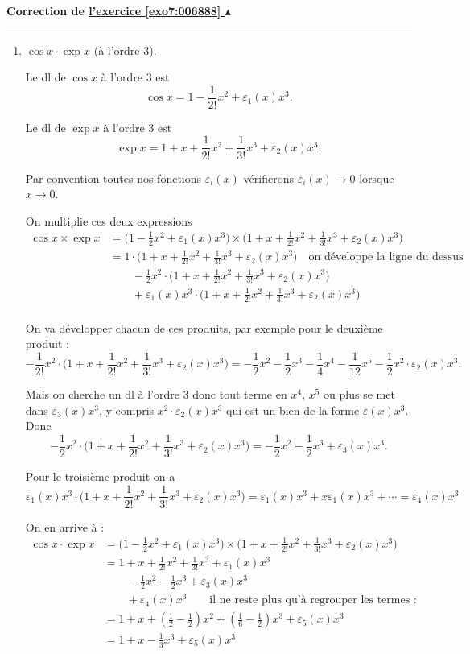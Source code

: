\documentclass[11pt,a4paper]{article}
\renewcommand{\epsilon}{\varepsilon}
\newcounter{exo}
\newcommand{\correction}[1]{\hypertarget{cor7:#1}{}\label{cor7:#1}{\bf Correction de \hyperlink{exo7:#1}{l'exercice \ref{exo7:#1} $\blacktriangle$}}\vspace{1mm}\hrule\vspace{1mm}}
\begin{document}
\correction{006888}
\begin{enumerate}
  \item $\cos x \cdot \exp x$ (à l'ordre $3$).
  
Le dl de $\cos x$ à l'ordre $3$ est
$$\cos x = 1 - \frac{1}{2!} x^2 + \epsilon_1(x)x^3.$$

Le dl de $\exp x$ à l'ordre $3$ est
$$\exp x =1+x+\frac1{2!}x^2+\frac1{3!}x^3 + \epsilon_2(x)x^3.$$

Par convention toutes nos fonctions $\epsilon_i(x)$ vérifierons $\epsilon_i(x)\to 0$ lorsque $x\to0$.

\bigskip

On multiplie ces deux expressions  
\begin{align*}
\cos x \times \exp x 
  & =  \Big(1 - \frac{1}{2} x^2   + \epsilon_1(x)x^3\Big) \times \Big( 1+x+\frac1{2!}x^2+\frac1{3!}x^3 + \epsilon_2(x)x^3\Big) \\
  & =  1 \cdot \Big(1+x+\frac1{2!}x^2+\frac1{3!}x^3 + \epsilon_2(x)x^3 \Big)  \quad \text{on développe la ligne du dessus}\\  
  & \qquad  - \frac{1}{2} x^2 \cdot \Big( 1+x+\frac1{2!}x^2+\frac1{3!}x^3 + \epsilon_2(x)x^3 \Big) \\
  & \qquad  + \epsilon_1(x)x^3 \cdot \Big(1+x+\frac1{2!}x^2+\frac1{3!}x^3 + \epsilon_2(x)x^3 \Big) \\
\end{align*}

On va développer chacun de ces produits, par exemple pour le deuxième produit :
$$- \frac{1}{2!} x^2 \cdot \Big(  1+x+\frac1{2!}x^2+\frac1{3!}x^3 +  \epsilon_2(x)x^3\Big)
= - \frac{1}{2} x^2 - \frac{1}{2} x^3 - \frac14x^4  -\frac1{12}x^5 -\frac12x^2\cdot \epsilon_2(x)x^3.$$

Mais on cherche un dl à l'ordre $3$ donc tout terme en $x^4$, $x^5$ ou plus se met dans $\epsilon_3(x)x^3$,
y compris $x^2 \cdot \epsilon_2(x)x^3$ qui est un bien de la forme $\epsilon(x)x^3$.
Donc $$- \frac{1}{2} x^2 \cdot \Big(1+x+\frac1{2!}x^2+\frac1{3!}x^3 + \epsilon_2(x)x^3\Big)
= - \frac{1}{2} x^2 - \frac{1}{2} x^3  + \epsilon_3(x)x^3.$$

Pour le troisième produit on a
$$\epsilon_1(x)x^3 \cdot \Big(1+x+\frac1{2!}x^2+\frac1{3!}x^3 + \epsilon_2(x)x^3\Big) 
= \epsilon_1(x)x^3+x\epsilon_1(x)x^3+\cdots = \epsilon_4(x)x^3$$

On en arrive à :
\begin{align*}
\cos x \cdot \exp x 
  & =  \Big(1 - \frac{1}{2} x^2 + \epsilon_1(x)x^3 \Big) \times \Big( 1+x+\frac1{2!}x^2+\frac1{3!}x^3 + \epsilon_2(x)x^3\Big) \\
  & = 1+x+\frac1{2!}x^2+\frac1{3!}x^3 +  \epsilon_1(x)x^3\\
  & \qquad - \frac{1}{2} x^2- \frac{1}{2} x^3  + \epsilon_3(x)x^3 \\
  & \qquad  + \epsilon_4(x)x^3 \qquad \text{il ne reste plus qu'à regrouper les termes :}  \\    
  & =  1 + x + (\frac12-\frac12) x^2 + (\frac{1}{6}- \frac{1}{2})x^3 + \epsilon_5(x)x^3 \\
  & =  1 + x - \frac13 x^3 + \epsilon_5(x)x^3 \\
\end{align*}


\end{enumerate}
\end{document}
